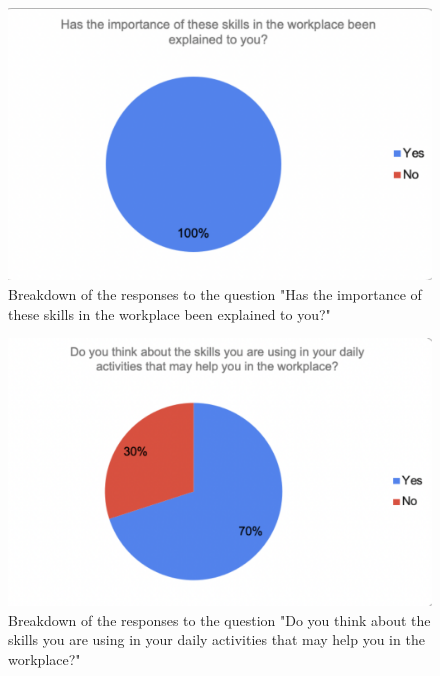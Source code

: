 \documentclass{l4proj}
\begin{document}
\begin{appendices}
\begin{figure}[H]
    \begin{centering}
    \includegraphics[scale=0.5]{images/GradAttr-5.pdf}
    \caption{Breakdown of the responses to the question "Has the importance of these skills in the workplace been explained to you?"}
    \label{fig: GradAttr-5}
    \end{centering}
\end{figure}

\begin{figure}[H]
    \begin{centering}
    \includegraphics[scale=0.5]{images/GradAttr-6.pdf}
    \caption{Breakdown of the responses to the question "Do you think about the skills you are using in your daily activities that may help you in the workplace?"}
    \label{fig: GradAttr-6}
    \end{centering}
\end{figure}


\end{appendices}
\end{document}
